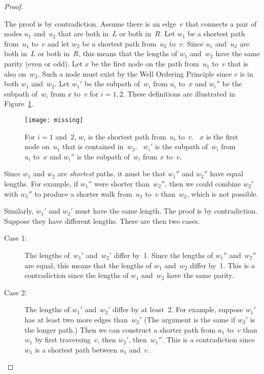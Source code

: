 \begin{editingnotes}
\begin{proof}
\begin{description}
The proof is by contradiction.  Assume there is an edge~$e$ that
connects a pair of nodes $u_1$ and~$u_2$ that are both in~$L$ or both
in~$R$.  Let $w_1$ be a shortest path from~$u_1$ to~$v$ and let $w_2$
be a shortest path from~$u_2$ to~$v$.  Since $u_1$ and~$u_2$ are both
in~$L$ or both in~$R$, this means that the lengths of $w_1$ and~$w_2$
have the same parity (even or odd).  Let $x$ be the first node on the
path from~$u_1$ to~$v$ that is also on~$w_2$.  Such a node must exist
by the Well Ordering Principle since $v$ is in both $w_1$ and~$w_2$.
Let $w_1'$ be the subpath of~$w_i$ from $u_i$ to~$x$ and $w_i''$ be
the subpath of~$w_i$ from $x$ to~$v$ for $i = 1, 2$.  These
definitions are illustrated in Figure~\ref{fig:XY3}.

\begin{figure}


\texttt{[image: missing]}

\caption{For $i = 1$ and~$2$, $w_i$ is the shortest path from~$u_i$
  to~$v$.  \ $x$ is the first node on~$u_1$ that is contained
  in~$w_2$. \ $w_i'$ is the subpath of~$w_i$ from $u_i$ to~$x$ and
  $w_i''$ is the subpath of~$w_i$ from $x$ to~$v$.}

\label{fig:XY3}

\end{figure}

Since $w_1$ and $w_2$ are \emph{shortest} paths, it must be that
$w_1''$ and $w_2''$ have equal lengths. For example, if $w_1''$ were
shorter than~$w_2''$, then we could combine $w_2'$ with $w_1''$ to
produce a shorter walk from~$u_2$ to~$v$ than~$w_2$, which is not
possible.

Similarly, $w_1'$ and $w_2'$ must have the same length.  The proof is
by contradiction.  Suppose they have different lengths.  There are
then two cases.

\begin{description}

\item[Case 1:]
The lengths of~$w_1'$ and~$w_2'$ differ by~1.  Since the lengths of
$w_1''$ and~$w_2''$ are equal, this means that the lengths of $w_1$
and~$w_2$ differ by~1.  This is a contradiction since the lengths of
$w_1$ and~$w_2$ have the same parity.

\item[Case 2:]
The lengths of $w_1'$ and~$w_2'$ differ by at least~2.  For example,
suppose $w_1'$ has at least two more edges than~$w_2'$  (The argument
is the same if $w_2'$ is the longer path.)  Then we can construct a
shorter path from $u_1$ to~$v$ than~$w_1$ by first traversing~$e$,
then $w_2'$, then~$w_1''$.  This is a contradiction since $w_1$ is a
shortest path between $u_1$ and~$v$.


\end{description}
\end{description}
\end{proof}
\end{editingnotes}
